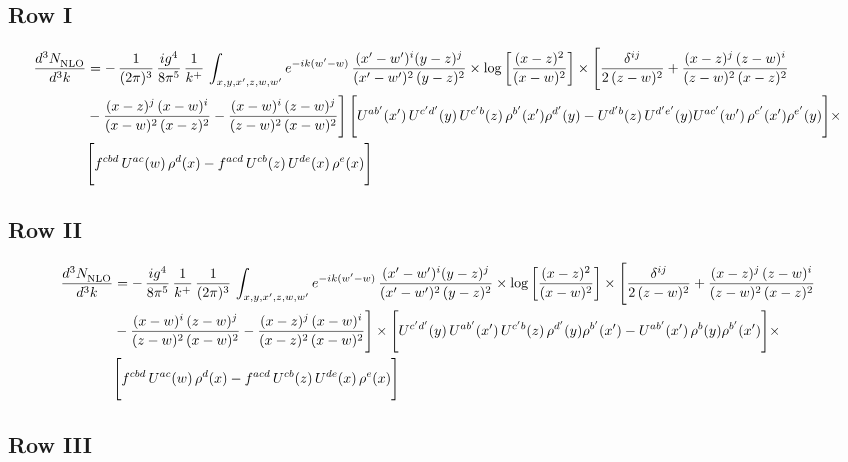 \documentclass[9pt]{article}
\numberwithin{equation}{section}
\begin{document}
\subsection{Row I}
\begin{align}
     \frac{d^{3}N_{\rm NLO}^{\rm}}{d^{3}k}  & =   -\,\frac{1}{(2\pi)^{3}}\, \frac{ig^{4}}{8\pi^{5}}\,\frac{1}{k^{+}}\,\int_{x,y,x',z,w,w^{\prime}} e^{-ik(w^{\prime}-w)}\,\frac{(x'-w')^{i}(y-z)^{j}}{(x'-w')^{2}\,(y-z)^{2}}\times \log{\left[\frac{(x-z)^{2}}{(x-w)^{2}}\right]}\times \Bigg[\frac{\delta^{ij}}{2\,(z-w)^{2}}+\frac{(x-z)^{j}\,(z-w)^{i}}{(z-w)^{2}\,(x-z)^{2}}\notag \\ & -\frac{(x-z)^{j}\,(x-w)^{i}}{(x-w)^{2}\,(x-z)^{2}}-\frac{(x-w)^{i}\,(z-w)^{j}}{(z-w)^{2}\,(x-w)^{2}}\Bigg]\, \Bigg[U^{ab'}(x')\,U^{c'd'}(y)\,U^{c'b}(z)\,\rho^{b'}(x')\rho^{d'}(y)-U^{d'b}(z)\,U^{d'e'}(y)U^{ac'}(w')\,\rho^{c'}(x')\rho^{e'}(y)\Bigg]\times\notag \\ & \Bigg[f^{cbd}\,U^{ac}(w)\,\rho^{d}(x)-f^{acd}\, U^{cb}(z)\,U^{de}(x)\,\rho^{e}(x)\Bigg]
\end{align}
\subsection{Row II}
\begin{align}
     \frac{d^{3}N_{\rm NLO}^{\rm}}{d^{3}k}  & =    
 -\,\frac{ig^{4}}{8\pi^{5}}\,\frac{1}{k^{+}}\,\frac{1}{(2\pi)^{3}}\, \int_{x,y,x',z,w,w^{\prime}} e^{-ik(w^{\prime}-w)}\,\frac{(x'-w')^{i}(y-z)^{j}}{(x'-w')^{2}\,(y-z)^{2}}\times \log{\left[\frac{(x-z)^{2}}{(x-w)^{2}}\right]}\times \Bigg[\frac{\delta^{ij}}{2\,(z-w)^{2}}+\frac{(x-z)^{j}\,(z-w)^{i}}{(z-w)^{2}\,(x-z)^{2}}\notag \\ & -\frac{(x-w)^{i}\,(z-w)^{j}}{(z-w)^{2}\,(x-w)^{2}}-\frac{(x-z)^{j}\,(x-w)^{i}}{(x-z)^{2}\,(x-w)^{2}}\Bigg]\times \Bigg[U^{c'd'}(y)\,U^{ab'}(x')\,U^{c'b}(z)\,\rho^{d'}(y)\rho^{b'}(x')-U^{ab'}(x')\,\rho^{b}(y)\rho^{b'}(x')\Bigg]\times\notag \\ & \Bigg[f^{cbd}\,U^{ac}(w)\,\rho^{d}(x)-f^{acd}\, U^{cb}(z)\,U^{de}(x)\,\rho^{e}(x)\Bigg]
\end{align}
 \subsection{Row III}
\end{document}
